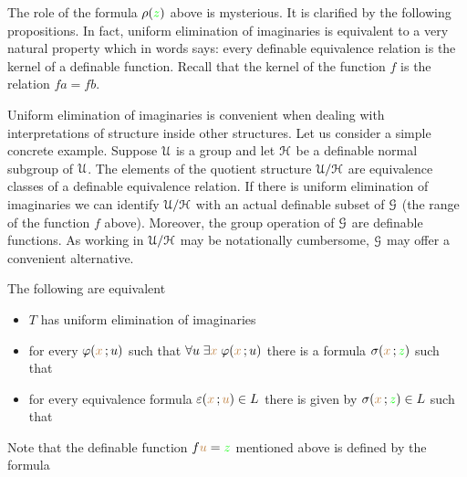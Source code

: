 The role of the formula $\rho({\color{green} z})$ above is mysterious.
It is clarified by the following propositions.
In fact, uniform elimination of imaginaries is equivalent to a very natural property which in words says: every definable equivalence relation is the kernel of a definable function.
Recall that the kernel of the function $f$ is the relation $fa=fb$.

Uniform elimination of imaginaries is convenient when dealing with interpretations of structure inside other structures.
Let us consider a simple concrete example.
Suppose $\EuScript U$ is a group and let $\EuScript H$ be a definable normal subgroup of $\EuScript U$.
The elements of the quotient structure $\EuScript U/\EuScript H$ are equivalence classes of a definable equivalence relation.
If there is uniform elimination of imaginaries we can identify $\EuScript U/\EuScript H$ with an actual definable subset of $\EuScript G$ (the range of the function $f$ above).
Moreover, the group operation of $\EuScript G$ are definable functions.
As working in $\EuScript U/\EuScript H$ may be notationally cumbersome, $\EuScript G$ may offer a convenient alternative.

\begin{proposition}\label{prop_uei_standard}
The following are equivalent
\begin{itemize}
\item[1.] $T$ has uniform elimination of imaginaries
\end{itemize}
\begin{itemize}
\item[2.] for every $\varphi({\color{brown} x}\,;u)$ such that  $\forall u\;\exists{\color{brown}x}\;\varphi({\color{brown} x}\,;u)$ there is a formula $\sigma({\color{brown} x}\,;{\color{green} z})$ such that 
\end{itemize}


\begin{itemize}
\item[3.] for every equivalence formula $\varepsilon({\color{brown} x}\,;{\color{brown} u})\in L$ there is given by $\sigma({\color{brown} x}\,;{\color{green} z})\in L$ such that
\end{itemize}



\end{proposition}

Note that the definable function $f{\color{brown} u}={\color{green} z}$ mentioned above is defined by the formula 

